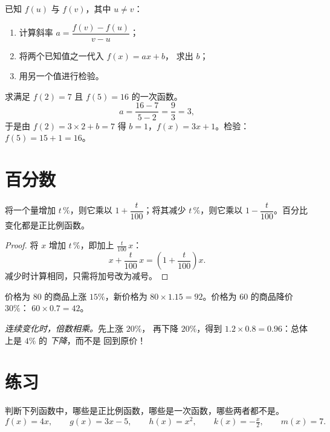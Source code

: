 \begin{method}[由两个函数值求一次函数]\label{met:g9:linfunc:findaffine}
已知 $f(u)$ 与 $f(v)$，其中 $u \neq v$：
\begin{enumerate}
  \item 计算斜率 $a = \dfrac{f(v) - f(u)}{v - u}$；
  \item 将两个已知值之一代入 $f(x) = ax + b$，
        求出 $b$；
  \item 用另一个值进行检验。
\end{enumerate}
\end{method}

\begin{example}\label{ex:g9:linfunc:findaffine}
求满足 $f(2) = 7$ 且 $f(5) = 16$ 的一次函数。
\[
a = \frac{16 - 7}{5 - 2} = \frac93 = 3 ,
\]
于是由 $f(2) = 3 \times 2 + b = 7$ 得 $b = 1$，$f(x) = 3x + 1$。检验：
$f(5) = 15 + 1 = 16$。
\end{example}

\section{百分数}

\begin{proposition}[百分比变化]\label{prop:g9:linfunc:percent}
将一个量增加 $t\,\%$，则它乘以
$1 + \dfrac{t}{100}$；将其减少 $t\,\%$，则它乘以
$1 - \dfrac{t}{100}$。百分比变化都是正比例函数。
\end{proposition}

\begin{proof}
将 $x$ 增加 $t\,\%$，即加上 $\frac{t}{100}\,x$：
\[
x + \frac{t}{100}\,x = \left(1 + \frac{t}{100}\right) x .
\]
减少时计算相同，只需将加号改为减号。
\end{proof}

\begin{example}\label{ex:g9:linfunc:percent}
价格为 $80$ 的商品上涨 $15\%$，新价格为
$80 \times 1.15 = 92$。价格为 $60$ 的商品降价 $30\%$：
$60 \times 0.7 = 42$。

\emph{连续变化时，倍数相乘。}先上涨 $20\%$，
再下降 $20\%$，得到
$1.2 \times 0.8 = 0.96$：总体上是 $4\%$ 的 \emph{下降}，而不是
回到原价！
\end{example}

\section{练习}

\begin{exercise}[$\star$]\label{exo:g9:linfunc:1}
判断下列函数中，哪些是正比例函数，哪些是一次函数，哪些两者都不是。
\[
f(x) = 4x, \qquad
g(x) = 3x - 5, \qquad
h(x) = x^2, \qquad
k(x) = -\tfrac x2, \qquad
m(x) = 7 .
\]
\end{exercise}

